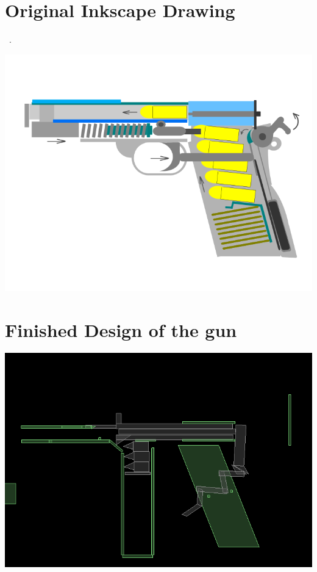 \documentclass [11pt]{report}
\begin{document}
\section{Original Inkscape Drawing} 
~\cite{ink}.

\begin{center}
\includegraphics[scale=0.5]{./images/gunink.png}
\end{center}
\section{Finished Design of the gun}
\begin{center}
\includegraphics[scale=0.5]{./images/gun.png}
\end{center}
\end{document}
